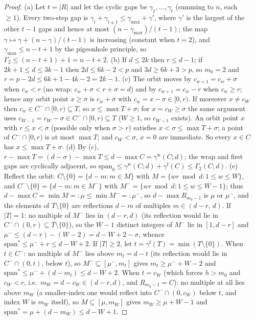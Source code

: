 \documentclass[11pt,a4paper]{article}
\numberwithin{equation}{section}
\theoremstyle{plain}
\theoremstyle{plain}
\theoremstyle{definition}
\theoremstyle{remark}
\begin{document}
\begin{proof}
(a) Let $t=|R|$ and let the cyclic gaps be $\gamma_1,\dots,\gamma_t$
(summing to $n$, each $\ge1$). Every two-step gap is
$\gamma_i+\gamma_{i\pm1}\le\gamma_{\max}+\gamma'$, where $\gamma'$ is
the largest of the other $t-1$ gaps and hence at most
$(n-\gamma_{\max})/(t-1)$; the map $\gamma\mapsto\gamma+(n-\gamma)/(t-1)$
is increasing (constant when $t=2$), and
$\gamma_{\max}\le n-t+1$ by the pigeonhole principle, so
$\Gamma_2\le(n-t+1)+1=n-t+2$.
(b) If $d\le2k$ then $r\le d-1$; if $2k+1\le d\le3k-1$ then
$2d\le6k-2<p$ and $3d\ge6k+3>p$, so $m_0=2$ and
$r=p-2d\le6k+1-4k-2=2k-1$.
(c) The orbit moves by $c_{w+1}=c_w+\sigma$ when $c_w<r$ (no wrap:
$c_w+\sigma<r+\sigma=d$) and by $c_{w+1}=c_w-r$ when $c_w\ge r$; hence
any orbit point $x\ge\sigma$ is $c_w+\sigma$ with $c_w=x-\sigma\in[0,r)$.
If moreover $x\ne c_W$ then $c_w\in C^-\cap[0,r)\subseteq T$, so
$x\le\max T+\sigma$; for $x=c_W\ge\sigma$ the same argument uses
$c_{W-1}=c_W-\sigma\in C^-\cap[0,r)\subseteq T$ ($W\ge1$, so $c_{W-1}$
exists). An orbit point $x$ with $r\le x<\sigma$ (possible only when
$\sigma>r$) satisfies $x<\sigma\le\max T+\sigma$; a point of
$C^-\cap[0,r)$ is at most $\max T$; and $c_W<\sigma$, $x=0$ are
immediate. So every $x\in C$ has $x\le\max T+\sigma$.
(d) By (c), $r-\max T=(d-\sigma)-\max T\le d-\max
C=\gamma^{\mathrm w}(C;d)$; the wrap and first gaps are cyclically
adjacent, so $\mathrm{span}_0\le\gamma^{\mathrm w}(C;d)+\gamma^{\mathrm
f}(C)\le\Gamma_2(C;d)$.
(e) Reflect the orbit: $C\setminus\{0\}=\{d-m:m\in M\}$ with
$M=\{wr\bmod d:1\le w\le W\}$, and $C^-\setminus\{0\}=\{d-m:m\in M^-\}$
with $M^-=\{wr\bmod d:1\le w\le W-1\}$; thus $d-\max C=\min M=:\mu\le
\min M^-=:\mu^-$, so $d-\max R_{m_0-1}$ is $\mu$ or $\mu^-$, and the
elements of $T\setminus\{0\}$ are reflections $d-m$ of multiples
$m\in(d-r,\,d)$. If $|T|=1$: no multiple of $M^-$ lies in $(d-r,d)$
(its reflection would lie in $C^-\cap(0,r)\subseteq T\setminus\{0\}$),
so the $W-1$ distinct integers of $M^-$ lie in $[1,d-r]$ and
$\mu^-\le(d-r)-(W-2)=d-W+2-\sigma$, whence
$\mathrm{span}^\ast\le\mu^-+r\le d-W+2$. If $|T|\ge2$, let
$t=\gamma^{\mathrm f}(T)=\min(T\setminus\{0\})$. When $t\in C^-$: no
multiple of $M^-$ lies above $m_t=d-t$ (its reflection would lie in
$C^-\cap(0,t)$, below $t$), so $M^-\subseteq[\mu^-,m_t]$ gives
$m_t\ge\mu^-+W-2$ and
$\mathrm{span}^\ast\le\mu^-+(d-m_t)\le d-W+2$. When $t=c_W$ (which
forces $h>m_0$ and $c_W<r$, i.e.\ $m_W=d-c_W\in(d-r,d)$, and
$R_{m_0-1}=C$): no multiple at all lies above $m_W$ (a smaller-index
one would reflect into $C^-\cap(0,c_W)$ below $t$, and index $W$ is
$m_W$ itself), so $M\subseteq[\mu,m_W]$ gives $m_W\ge\mu+W-1$ and
$\mathrm{span}^\ast=\mu+(d-m_W)\le d-W+1$.
\end{proof}
\end{document}
